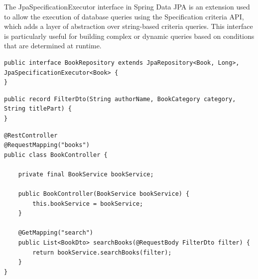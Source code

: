 The JpaSpecificationExecutor interface in Spring Data JPA is an extension used to allow the execution of database queries using the Specification criteria API, which adds a layer of abstraction over string-based criteria queries. This interface is particularly useful for building complex or dynamic queries based on conditions that are determined at runtime.

\begin{lstlisting}
public interface BookRepository extends JpaRepository<Book, Long>, JpaSpecificationExecutor<Book> {
}
\end{lstlisting}

\begin{lstlisting}
public record FilterDto(String authorName, BookCategory category, String titlePart) {
}
\end{lstlisting}

\begin{lstlisting}
@RestController
@RequestMapping("books")
public class BookController {

    private final BookService bookService;

    public BookController(BookService bookService) {
        this.bookService = bookService;
    }

    @GetMapping("search")
    public List<BookDto> searchBooks(@RequestBody FilterDto filter) {
        return bookService.searchBooks(filter);
    }
}

\end{lstlisting}


